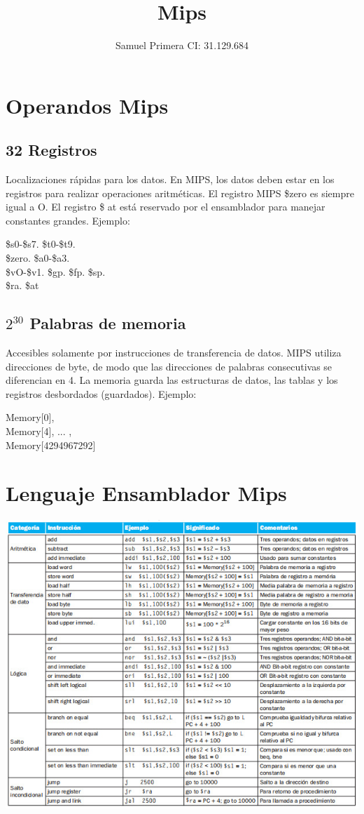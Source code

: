 \documentclass[12pt]{article}
\title{{\Huge \textbf{Mips}}}
\author{Samuel Primera CI: 31.129.684}
\begin{document}
	\maketitle
	
	
	\section{Operandos Mips}
	
	\subsection{32 Registros}
	
	Localizaciones rápidas para los datos. En MIPS, los datos deben estar en los registros para realizar operaciones aritméticas. El registro MIPS \$zero es siempre igual a O. El registro \$ at está reservado por el ensamblador para manejar constantes grandes. Ejemplo:
	
	\begin{center}
		\$s0-\$s7. \$t0-\$t9.\\
		\$zero. \$a0-\$a3.\\
		\$vO-\$v1. \$gp. \$fp. \$sp.\\
		\$ra. \$at\\
	\end{center}
	
	\subsection{$2^{30}$ Palabras de memoria}
	
	Accesibles solamente por instrucciones de transferencia de datos. MIPS utiliza direcciones de byte, de modo que las direcciones de palabras consecutivas se diferencian en 4. La memoria guarda las estructuras de datos, las tablas y los registros desbordados (guardados). Ejemplo:
	
	\begin{center}
		Memory[0],\\
		Memory[4], ... ,\\
		Memory[4294967292]
	\end{center}
	
	\section{Lenguaje Ensamblador Mips}
	
	\begin{flushleft}
		\includegraphics[width=1.2\linewidth]{LenguajeEsambladorMips.jpg}
		\end{flushleft}
	
\end{document}
